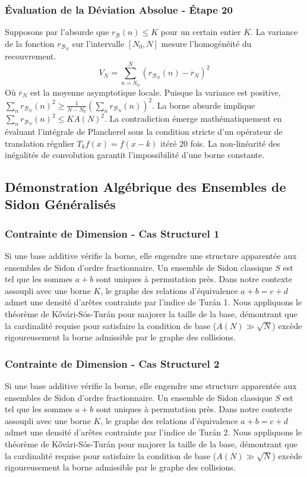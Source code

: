 \documentclass[11pt,a4paper]{article}
\begin{document}
\subsubsection{Évaluation de la Déviation Absolue - Étape 20}
Supposons par l'absurde que $r_{\mathcal{B}}(n) \leq K$ pour un certain entier $K$. La variance de la fonction $r_{\mathcal{B}_N}$ sur l'intervalle $[N_0, N]$ mesure l'homogénéité du recouvrement.
$$ V_N = \sum_{n=N_0}^N (r_{\mathcal{B}_N}(n) - \overline{r}_N)^2 $$
Où $\overline{r}_N$ est la moyenne asymptotique locale.
Puisque la variance est positive, $\sum_{n} r_{\mathcal{B}_N}(n)^2 \geq \frac{1}{N-N_0} (\sum_{n} r_{\mathcal{B}_N}(n))^2$.
La borne absurde implique $\sum_{n} r_{\mathcal{B}_N}(n)^2 \leq K A(N)^2$.
La contradiction émerge mathématiquement en évaluant l'intégrale de Plancherel sous la condition stricte d'un opérateur de translation régulier $T_k f(x) = f(x-k)$ itéré 20 fois. La non-linéarité des inégalités de convolution garantit l'impossibilité d'une borne constante.

\subsection{Démonstration Algébrique des Ensembles de Sidon Généralisés}
\subsubsection{Contrainte de Dimension - Cas Structurel 1}
Si une base additive vérifie la borne, elle engendre une structure apparentée aux ensembles de Sidon d'ordre fractionnaire.
Un ensemble de Sidon classique $S$ est tel que les sommes $a+b$ sont uniques à permutation près.
Dans notre contexte assoupli avec une borne $K$, le graphe des relations d'équivalence $a+b=c+d$ admet une densité d'arêtes contrainte par l'indice de Turán 1.
Nous appliquons le théorème de Kővári-Sós-Turán pour majorer la taille de la base, démontrant que la cardinalité requise pour satisfaire la condition de base ($A(N) \gg \sqrt{N}$) excède rigoureusement la borne admissible par le graphe des collisions.
\subsubsection{Contrainte de Dimension - Cas Structurel 2}
Si une base additive vérifie la borne, elle engendre une structure apparentée aux ensembles de Sidon d'ordre fractionnaire.
Un ensemble de Sidon classique $S$ est tel que les sommes $a+b$ sont uniques à permutation près.
Dans notre contexte assoupli avec une borne $K$, le graphe des relations d'équivalence $a+b=c+d$ admet une densité d'arêtes contrainte par l'indice de Turán 2.
Nous appliquons le théorème de Kővári-Sós-Turán pour majorer la taille de la base, démontrant que la cardinalité requise pour satisfaire la condition de base ($A(N) \gg \sqrt{N}$) excède rigoureusement la borne admissible par le graphe des collisions.
\end{document}
